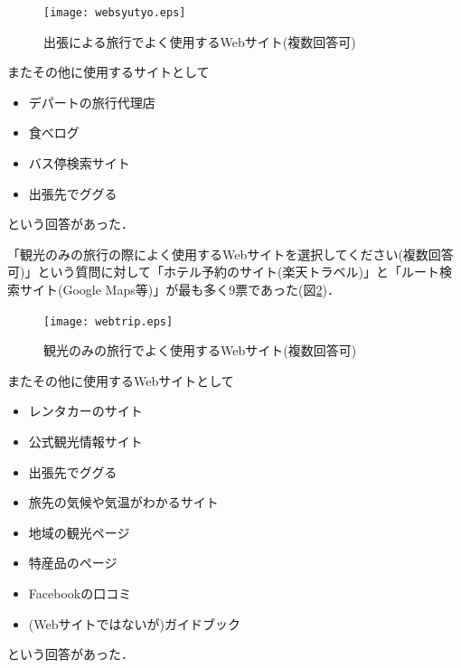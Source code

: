 \documentclass{funthesis}
\begin{document}
\begin{figure}[htpb]
\begin{center}
\texttt{[image: websyutyo.eps]}
\end{center}
\caption{出張による旅行でよく使用するWebサイト(複数回答可)}
\label{Lwebsyutyo}
\end{figure}

またその他に使用するサイトとして
\begin{itemize}
 \item デパートの旅行代理店
 \item 食べログ
 \item バス停検索サイト
 \item 出張先でググる
\end{itemize}
という回答があった．

\clearpage

「観光のみの旅行の際によく使用するWebサイトを選択してください(複数回答可)」という質問に対して「ホテル予約のサイト(楽天トラベル)」と「ルート検索サイト(Google Maps等)」が最も多く9票であった(図\ref{Lwebtrip})．

\begin{figure}[htpb]
\begin{center}
\texttt{[image: webtrip.eps]}
\end{center}
\caption{観光のみの旅行でよく使用するWebサイト(複数回答可)}
\label{Lwebtrip}
\end{figure}


またその他に使用するWebサイトとして
\begin{itemize}
 \item レンタカーのサイト
 \item 公式観光情報サイト
 \item 出張先でググる
 \item 旅先の気候や気温がわかるサイト
 \item 地域の観光ページ
 \item 特産品のページ
 \item Facebookの口コミ
 \item (Webサイトではないが)ガイドブック
\end{itemize}
という回答があった．

\clearpage
\end{document}
